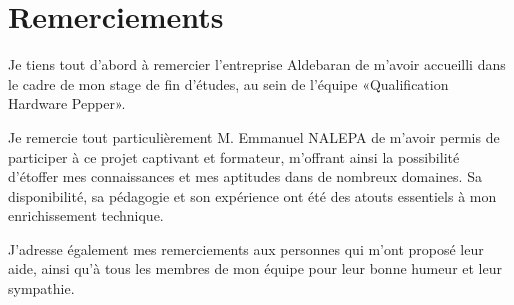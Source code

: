 \chapter*{Remerciements}

Je tiens tout d'abord à remercier l'entreprise Aldebaran de m'avoir accueilli dans le cadre de mon stage de fin d'études, au sein de l'équipe «Qualification Hardware Pepper».
\newline 

Je remercie tout particulièrement M. Emmanuel NALEPA de m'avoir permis de participer à ce projet captivant et formateur, m’offrant ainsi la possibilité d'étoffer mes connaissances et mes aptitudes dans de nombreux domaines. Sa disponibilité, sa pédagogie et son expérience ont été des atouts essentiels à mon enrichissement technique.
\newline

J’adresse également mes remerciements aux personnes qui m'ont proposé leur aide, ainsi qu'à tous les membres de mon équipe pour leur bonne humeur et leur sympathie.